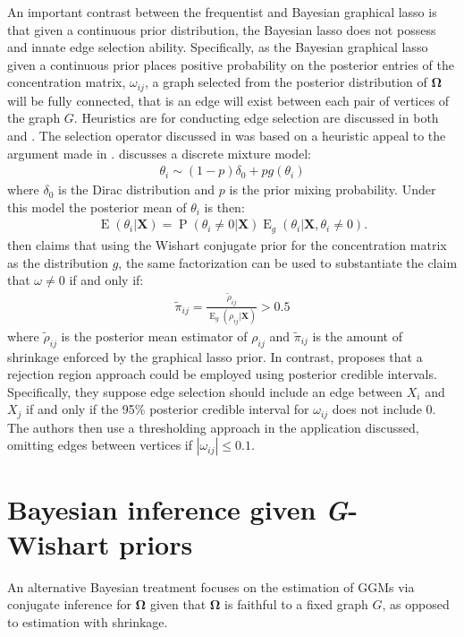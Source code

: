 \documentclass[11pt]{article}
\DeclareMathOperator{\PP}{P}
\DeclareMathOperator{\EE}{E}
\begin{document}
An important contrast between the frequentist and Bayesian graphical lasso is that given a continuous prior distribution, the Bayesian lasso does not possess and innate edge selection ability. Specifically, as the Bayesian graphical lasso given a continuous prior places positive probability on the posterior entries of the concentration matrix, $\omega_{ij}$, a graph selected from the posterior distribution of $\boldsymbol{\Omega}$ will be fully connected, that is an edge will exist between each pair of vertices of the graph $G$. Heuristics are for conducting edge selection are discussed in both \citep{wang2012}  and \cite{peterson2013}. The selection operator discussed in \citep{wang2012} was based on a heuristic appeal to the argument made in \citep{carvalho2010}.  \citep{carvalho2010} discusses a discrete mixture model:
\begin{align}
	\theta_i \sim (1-p)\delta_0 + pg(\theta_i)
\end{align}
where $\delta_0$ is the Dirac distribution and $p$ is the prior mixing probability. Under this model the posterior mean of $\theta_i$ is then:
\begin{align}
	\EE(\theta_i|\textbf{X})=\PP(\theta_i\neq 0|\textbf{X})\EE_g(\theta_i|\textbf{X},\theta_i\neq 0).
\end{align}
\citep{wang2012} then claims that using the Wishart conjugate prior for the concentration matrix as the distribution $g$, the same factorization can be used to substantiate the claim that $\omega \neq 0$ if and only if:
\begin{align}
	\tilde{\pi}_{ij}=\frac{\tilde{\rho}_{ij}}{\EE_g(\rho_{ij}|\textbf{X})}>0.5
\end{align}
where $\tilde{\rho}_{ij}$ is the posterior mean estimator of $\rho_{ij}$ and $\tilde{\pi}_{ij}$ is the amount of shrinkage enforced by the graphical lasso prior. In contrast, \citep{peterson2013} proposes that a rejection region approach could be employed using posterior credible intervals. Specifically, they suppose edge selection should include an edge between $X_i$ and $X_j$ if and only if the 95\% posterior credible interval for $\omega_{ij}$ does not include 0. The authors then use a thresholding approach in the application discussed, omitting edges between vertices if $|\omega_{ij}|\leq 0.1$.

\section{Bayesian inference given \emph{G}-Wishart priors}
An alternative Bayesian treatment focuses on  \cite{dawid1993,roverato2002,atay2005,dobra2011a,dobra2011b,wang2012,cheng2012} the estimation of GGMs via conjugate inference for $\boldsymbol{\Omega}$ given that $\boldsymbol{\Omega}$ is faithful to a fixed graph $G$, as opposed to estimation with shrinkage.
\end{document}
